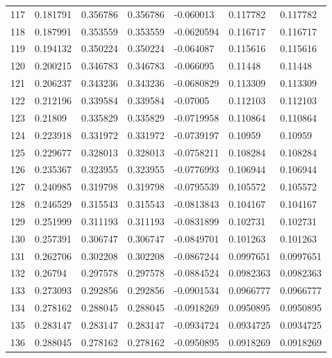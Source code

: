 \begin{longtable}{l|lll|lll}
 117 &  0.181791    & 0.356786    & 0.356786    & -0.060013    & 0.117782    & 0.117782    \\
 118 &  0.187991    & 0.353559    & 0.353559    & -0.0620594   & 0.116717    & 0.116717    \\
 119 &  0.194132    & 0.350224    & 0.350224    & -0.064087    & 0.115616    & 0.115616    \\
 120 &  0.200215    & 0.346783    & 0.346783    & -0.066095    & 0.11448     & 0.11448     \\
 121 &  0.206237    & 0.343236    & 0.343236    & -0.0680829   & 0.113309    & 0.113309    \\
 122 &  0.212196    & 0.339584    & 0.339584    & -0.07005     & 0.112103    & 0.112103    \\
 123 &  0.21809     & 0.335829    & 0.335829    & -0.0719958   & 0.110864    & 0.110864    \\
 124 &  0.223918    & 0.331972    & 0.331972    & -0.0739197   & 0.10959     & 0.10959     \\
 125 &  0.229677    & 0.328013    & 0.328013    & -0.0758211   & 0.108284    & 0.108284    \\
 126 &  0.235367    & 0.323955    & 0.323955    & -0.0776993   & 0.106944    & 0.106944    \\
 127 &  0.240985    & 0.319798    & 0.319798    & -0.0795539   & 0.105572    & 0.105572    \\
 128 &  0.246529    & 0.315543    & 0.315543    & -0.0813843   & 0.104167    & 0.104167    \\
 129 &  0.251999    & 0.311193    & 0.311193    & -0.0831899   & 0.102731    & 0.102731    \\
 130 &  0.257391    & 0.306747    & 0.306747    & -0.0849701   & 0.101263    & 0.101263    \\
 131 &  0.262706    & 0.302208    & 0.302208    & -0.0867244   & 0.0997651   & 0.0997651   \\
 132 &  0.26794     & 0.297578    & 0.297578    & -0.0884524   & 0.0982363   & 0.0982363   \\
 133 &  0.273093    & 0.292856    & 0.292856    & -0.0901534   & 0.0966777   & 0.0966777   \\
 134 &  0.278162    & 0.288045    & 0.288045    & -0.0918269   & 0.0950895   & 0.0950895   \\
 135 &  0.283147    & 0.283147    & 0.283147    & -0.0934724   & 0.0934725   & 0.0934725   \\
 136 &  0.288045    & 0.278162    & 0.278162    & -0.0950895   & 0.0918269   & 0.0918269   \\

\end{longtable}
